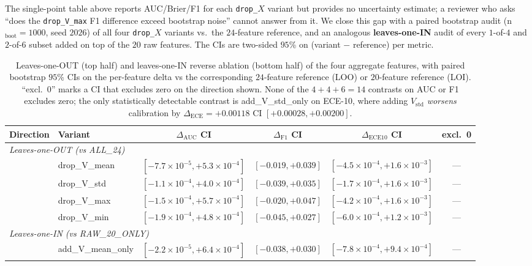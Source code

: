 The single-point table above reports AUC/Brier/F1 for each
\texttt{drop\_$X$} variant but provides no uncertainty estimate; a
reviewer who asks ``does the \texttt{drop\_V\_max} F1 difference
exceed bootstrap noise'' cannot answer from it. We close this gap with
a paired bootstrap audit (n$_{\text{boot}}{=}1000$, seed $2026$) of
all four \texttt{drop\_$X$} variants vs.\ the $24$-feature reference,
and an analogous \textbf{leaves-one-IN} audit of every $1$-of-$4$ and
$2$-of-$6$ subset added on top of the $20$ raw features. The CIs are
two-sided $95$\% on (variant $-$ reference) per metric.

\begin{table}[t]
\centering
\small
\caption{Leaves-one-OUT (top half) and leaves-one-IN reverse
ablation (bottom half) of the four aggregate features, with paired
bootstrap $95$\% CIs on the per-feature delta vs the
corresponding $24$-feature reference (LOO) or $20$-feature reference
(LOI). ``excl.\ 0'' marks a CI that excludes zero on the direction
shown. None of the $4{+}4{+}6{=}14$ contrasts on AUC or F1
excludes zero; the only statistically detectable contrast is
\textsf{add\_V\_std\_only} on ECE-10, where adding $V_{\text{std}}$
\emph{worsens} calibration by $\Delta_{\text{ECE}}{=}{+}0.00118$
CI $[{+}0.00028, {+}0.00200]$.}
\label{tab:p8-perfeat-abl}
\begin{tabular}{llcccc}
\toprule
Direction & Variant & $\Delta_{\text{AUC}}$ CI & $\Delta_{\text{F1}}$ CI & $\Delta_{\text{ECE10}}$ CI & excl.\ 0 \\
\midrule
\multicolumn{6}{l}{\emph{Leaves-one-OUT (vs ALL\_24)}} \\
& drop\_V\_mean & $[-7.7\!\times\!10^{-5}, +5.3\!\times\!10^{-4}]$ & $[-0.019, +0.039]$ & $[-4.5\!\times\!10^{-4}, +1.6\!\times\!10^{-3}]$ & --- \\
& drop\_V\_std  & $[-1.1\!\times\!10^{-4}, +4.0\!\times\!10^{-4}]$ & $[-0.039, +0.035]$ & $[-1.7\!\times\!10^{-4}, +1.6\!\times\!10^{-3}]$ & --- \\
& drop\_V\_max  & $[-1.5\!\times\!10^{-4}, +5.7\!\times\!10^{-4}]$ & $[-0.020, +0.047]$ & $[-4.2\!\times\!10^{-4}, +1.6\!\times\!10^{-3}]$ & --- \\
& drop\_V\_min  & $[-1.9\!\times\!10^{-4}, +4.8\!\times\!10^{-4}]$ & $[-0.045, +0.027]$ & $[-6.0\!\times\!10^{-4}, +1.2\!\times\!10^{-3}]$ & --- \\
\midrule
\multicolumn{6}{l}{\emph{Leaves-one-IN (vs RAW\_20\_ONLY)}} \\
& add\_V\_mean\_only & $[-2.2\!\times\!10^{-5}, +6.4\!\times\!10^{-4}]$ & $[-0.038, +0.030]$ & $[-7.8\!\times\!10^{-4}, +9.4\!\times\!10^{-4}]$ & --- \\

\end{tabular}
\end{table}
